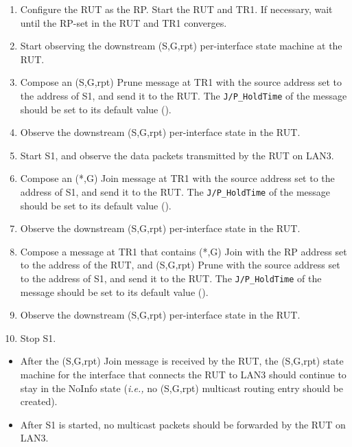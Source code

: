 \documentclass[11pt]{report}
\newcommand{\ie}{\emph{i.e.,}\xspace}
\begin{document}

\begin{enumerate}

  \item Configure the RUT as the RP. Start the RUT and TR1. If
  necessary, wait until the RP-set in the RUT and TR1 converges.

  \item Start observing the downstream (S,G,rpt) per-interface state
  machine at the RUT.

  \item Compose an (S,G,rpt) Prune message at TR1 with the source address set
  to the address of S1, and send it to the RUT.
  The \verb=J/P_HoldTime= of the message should be set to its default
  value ({\PimsmJPHoldTime}).

  \item Observe the downstream (S,G,rpt) per-interface state in the RUT.

  \item Start S1, and observe the data packets transmitted by the RUT on
  LAN3.

  \item Compose an (*,G) Join message at TR1 with the source address set
  to the address of S1, and send it to the RUT.
  The \verb=J/P_HoldTime= of the message should be set to its default
  value ({\PimsmJPHoldTime}).

  \item Observe the downstream (S,G,rpt) per-interface state in the RUT.

  \item Compose a message at TR1 that contains (*,G) Join with the RP
  address set to the address of the RUT, and (S,G,rpt) Prune with the source
  address set to the address of S1, and send it to the RUT.
  The \verb=J/P_HoldTime= of the message should be set to its default
  value ({\PimsmJPHoldTime}).

  \item Observe the downstream (S,G,rpt) per-interface state in the RUT.

  \item Stop S1.

\end{enumerate}



\begin{itemize}

  \item After the (S,G,rpt) Join message is received by the RUT,
  the (S,G,rpt) state machine for the interface that connects the RUT to
  LAN3 should continue to stay in the NoInfo state (\ie no (S,G,rpt) multicast
  routing entry should be created).

  \item After S1 is started, no multicast packets should be
  forwarded by the RUT on LAN3.

\end{itemize}
\end{document}
